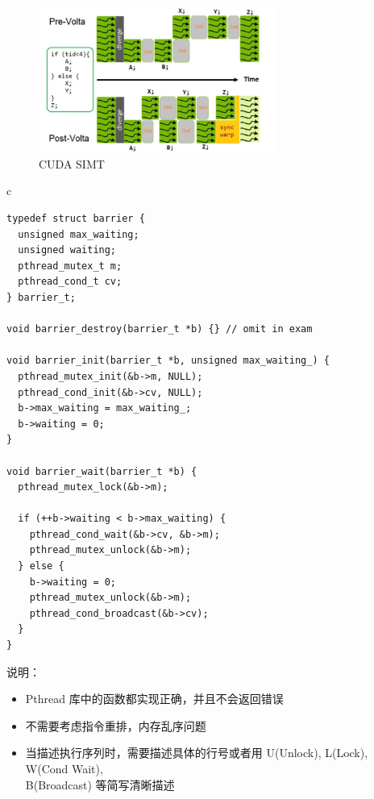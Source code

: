 \documentclass[a4paper,12pt]{article}
\begin{document}
\begin{figure}[!htb]
  \centering
  \includegraphics[width=0.7\textwidth]{img/simt.png}
  \caption{CUDA SIMT}
\end{figure}

\begin{table}[htb]
  \centering
  \begin{tabular}{c}
    \begin{lstlisting}
typedef struct barrier {
  unsigned max_waiting;
  unsigned waiting;
  pthread_mutex_t m;
  pthread_cond_t cv;
} barrier_t;

void barrier_destroy(barrier_t *b) {} // omit in exam

void barrier_init(barrier_t *b, unsigned max_waiting_) {
  pthread_mutex_init(&b->m, NULL);
  pthread_cond_init(&b->cv, NULL);
  b->max_waiting = max_waiting_;
  b->waiting = 0;
}

void barrier_wait(barrier_t *b) {
  pthread_mutex_lock(&b->m);

  if (++b->waiting < b->max_waiting) {
    pthread_cond_wait(&b->cv, &b->m);
    pthread_mutex_unlock(&b->m);
  } else {
    b->waiting = 0;
    pthread_mutex_unlock(&b->m);
    pthread_cond_broadcast(&b->cv);
  }
}
    \end{lstlisting}
  \end{tabular}
\end{table}



说明：

\begin{itemize}
  \item Pthread 库中的函数都实现正确，并且不会返回错误
  \item 不需要考虑指令重排，内存乱序问题
  \item 当描述执行序列时，需要描述具体的行号或者用 U(Unlock), L(Lock), W(Cond Wait), \\
        B(Broadcast) 等简写清晰描述
\end{itemize}
\end{document}
